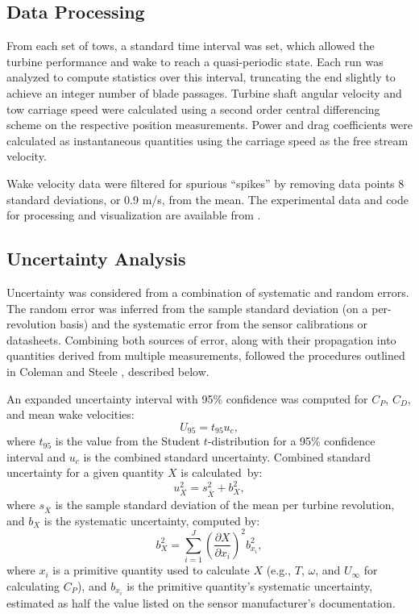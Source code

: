 \documentclass[energies,article,accept,moreauthors,pdftex,10pt,a4paper]{mdpi}
\theoremstyle{mdpi}
\newcounter{ex}
\newcounter{re}
\begin{document}
\subsection{Data Processing}

From each set of tows, a standard time interval was set, which allowed the
turbine performance and wake to reach a quasi-periodic state. Each run was
analyzed to compute statistics over this interval, truncating the end slightly
to achieve an integer number of blade passages. Turbine shaft angular velocity
and tow carriage speed were calculated using a second order central differencing
scheme on the respective position measurements. Power and drag coefficients were
calculated as instantaneous quantities using the carriage speed as the free
stream velocity.

Wake velocity data were filtered for spurious ``spikes'' by removing data points
8 standard deviations, or 0.9 m/s, from the mean. The experimental data and code
for processing and visualization are available from
\cite{Bachant2015-RVAT-Re-dep-data}.


\subsection{Uncertainty Analysis}

Uncertainty was considered from a combination of systematic and random errors.
The random error was inferred from the sample standard deviation (on a
per-revolution basis) and the systematic error from the sensor calibrations or
datasheets. Combining both sources of error, along with their propagation into
quantities derived from multiple measurements, followed the procedures outlined
in Coleman and Steele \cite{ColemanSteele}, described below.

An expanded uncertainty interval with 95\% confidence was computed for
$C_P$, $C_D$, and mean wake velocities:
\begin{equation}
 U_{95} = t_{95} u_c,
\end{equation}
where $t_{95}$ is the value from the Student $t$-distribution for a 95\%
confidence interval and $u_c$ is the combined standard uncertainty. Combined
standard uncertainty for a given quantity $X$ is calculated~by:
\begin{equation}
 u_X^2 = s_{\bar{X}}^2 + b_X^2,
\end{equation}
where $s_{\bar{X}}$ is the sample standard deviation of the mean per turbine
revolution, and $b_X$ is the systematic uncertainty, computed by:
\begin{equation}
 b_{X}^2 = \sum_{i=1}^J \left( \frac{\partial X}{\partial x_i} \right)^2
 b_{x_i}^2,
\end{equation}
where $x_i$ is a primitive quantity used to calculate $X$ (e.g., $T$, $\omega$,
and $U_\infty$ for calculating $C_P$), and $b_{x_i}$ is the primitive quantity's
systematic uncertainty, estimated as half the value listed on the sensor
manufacturer's documentation.
\end{document}
